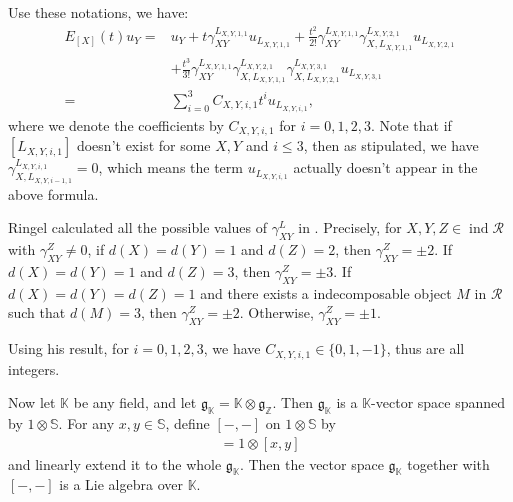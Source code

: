 \documentclass[12pt]{amsart}
\begin{document}
Use these notations, we have:
%
%
%
\begin{equation}
    \begin{aligned}
    E_{[X]}(t)u_Y = & u_Y+t \gamma^{L_{X,Y,1,1}}_{XY} u_{L_{X,Y,1,1}} + \frac{t^2}{2!} \gamma^{L_{X,Y,1,1}}_{XY} \gamma^{L_{X,Y,2,1}}_{X,L_{X,Y,1,1}} u_{L_{X,Y,2,1}} \\
    &+ \frac{t^3}{3!} \gamma^{L_{X,Y,1,1}}_{XY} \gamma^{L_{X,Y,2,1}}_{X,L_{X,Y,1,1}} \gamma^{L_{X,Y,3,1}}_{X,L_{X,Y,2,1}} u_{L_{X,Y,3,1}}\\
    =& \sum\limits_{i=0}^3 C_{X,Y,i,1} t^i u_{L_{X,Y,i,1}},
    \end{aligned}
\end{equation}
where we denote the coefficients by $C_{X,Y,i,1}$ for $i=0,1,2,3$.
Note that if $[L_{X,Y,i,1}]$ doesn't exist for some $X,Y$ and $i\leq 3$, then as stipulated, we have $\gamma_{X,L_{X,Y,i-1,1}}^{L_{X,Y,i,1}} = 0$, which means the term $u_{L_{X,Y,i,1}}$ actually doesn't appear in the above formula.  

Ringel calculated all the possible values of $\gamma_{XY}^{L}$ in \cite{RINGEL1990137}.
Precisely, for $X,Y,Z\in \operatorname{ind}\mathcal{R}$ with $\gamma_{XY}^Z\neq 0$, if $d(X)=d(Y)=1$ and $d(Z)=2$, then $\gamma_{XY}^Z=\pm 2$.
If $d(X)=d(Y)=1$ and $d(Z)=3$, then $\gamma_{XY}^Z=\pm 3$.
If $d(X)=d(Y)=d(Z)=1$ and there exists a indecomposable object $M$ in $\mathcal{R}$ such that $d(M)=3$, then $\gamma_{XY}^Z=\pm 2$.
Otherwise, $\gamma_{XY}^Z =\pm 1$.

Using his result, for $i=0,1,2,3$, we have $C_{X,Y,i,1}\in \{ 0,1,-1\}$, thus are all integers.

Now let $\mathbb{K}$ be any field, and let $\mathfrak{g}_{\mathbb{K}} = \mathbb{K}\otimes \mathfrak{g}_{\mathbb{Z}} $.
Then $\mathfrak{g}_{\mathbb{K}}$ is a $\mathbb{K}$-vector space spanned by $1\otimes \mathbb{S}$.
For any $x,y\in  \mathbb{S}$, define $[-,-]$ on $1\otimes \mathbb{S}$ by 
\begin{align*}
    [1\otimes x,1\otimes y] = 1\otimes [x,y]
\end{align*}
and linearly extend it to the whole $\mathfrak{g}_{\mathbb{K}}$. 
Then the vector space $\mathfrak{g}_{\mathbb{K}}$ together with $[-,-]$ is a Lie algebra over $\mathbb{K}$.
\end{document}
